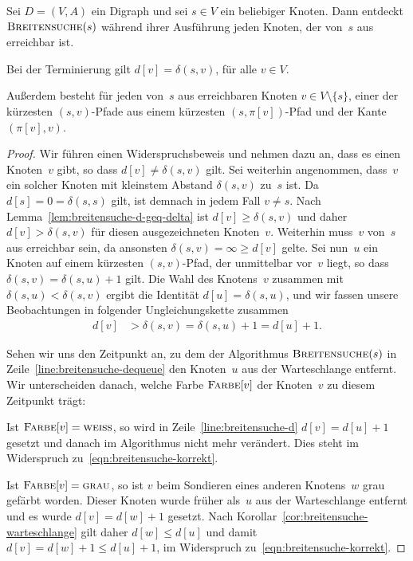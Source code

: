 \begin{thm}
\label{thm:breitensuche}
Sei $D=(V,A)$ ein Digraph und sei $s \in V$ ein beliebiger Knoten.
Dann entdeckt $\mathop{\text{\textsc{Breitensuche}}}(s)$ während ihrer Ausführung jeden Knoten, der von~$s$ aus erreichbar ist. 

Bei der Terminierung gilt $d[v] = \delta(s,v)$, für alle $v \in V$.

Außerdem besteht für jeden von~$s$ aus erreichbaren Knoten $v \in V \setminus \{ s\}$, einer der kürzesten $(s,v)$-Pfade aus einem kürzesten $(s,\pi[v])$-Pfad und der Kante $(\pi[v],v)$.
\end{thm}

\begin{proof}
Wir führen einen Widerspruchsbeweis und nehmen dazu an, dass es einen Knoten~$v$ gibt, so dass $d[v] \neq \delta(s,v)$ gilt.
Sei weiterhin angenommen, dass~$v$ ein solcher Knoten mit kleinstem Abstand $\delta(s,v)$ zu~$s$ ist.
Da $d[s]=0=\delta(s,s)$ gilt, ist demnach in jedem Fall $v \neq s$.
Nach Lemma~\ref{lem:breitensuche-d-geq-delta} ist $d[v] \geq \delta(s,v)$ und daher $d[v] > \delta(s,v)$ für diesen ausgezeichneten Knoten~$v$.
Weiterhin muss~$v$ von~$s$ aus erreichbar sein, da ansonsten $\delta(s,v)=\infty \geq d[v]$ gelte.
Sei nun~$u$ ein Knoten auf einem kürzesten $(s,v)$-Pfad, der unmittelbar vor~$v$ liegt, so dass $\delta(s,v)=\delta(s,u)+1$ gilt.
Die Wahl des Knotens~$v$ zusammen mit $\delta(s,u) < \delta(s,v)$ ergibt die Identität $d[u]=\delta(s,u)$, und wir fassen unsere Beobachtungen in folgender Ungleichungskette zusammen
\begin{align}
d[v] &> \delta(s,v) = \delta(s,u) + 1 = d[u] + 1.\label{eqn:breitensuche-korrekt}
\end{align}

Sehen wir uns den Zeitpunkt an, zu dem der Algorithmus $\mathop{\text{\textsc{Breitensuche}}}(s)$ in Zeile~\ref{line:breitensuche-dequeue} den Knoten~$u$ aus der Warteschlange entfernt.
Wir unterscheiden danach, welche Farbe $\mathop{\text{\textsc{Farbe}}}[v]$ der Knoten~$v$ zu diesem Zeitpunkt trägt:

Ist $\mathop{\text{\textsc{Farbe}}}[v]=\mathop{\text{\textsc{weiss}}}$, so wird in Zeile~\ref{line:breitensuche-d} $d[v]=d[u]+1$ gesetzt und danach im Algorithmus nicht mehr verändert.
Dies steht im Widerspruch zu~\eqref{eqn:breitensuche-korrekt}.

Ist $\mathop{\text{\textsc{Farbe}}}[v]=\mathop{\text{\textsc{grau}}}$, so ist $v$ beim Sondieren eines anderen Knotens~$w$  grau gefärbt worden.
Dieser Knoten wurde früher als~$u$ aus der Warteschlange entfernt und es wurde $d[v]=d[w]+1$ gesetzt.
Nach Korollar~\ref{cor:breitensuche-warteschlange} gilt daher $d[w] \leq d[u]$ und damit $d[v]=d[w]+1 \leq d[u]+1$, im Widerspruch zu~\eqref{eqn:breitensuche-korrekt}.


\end{proof}
